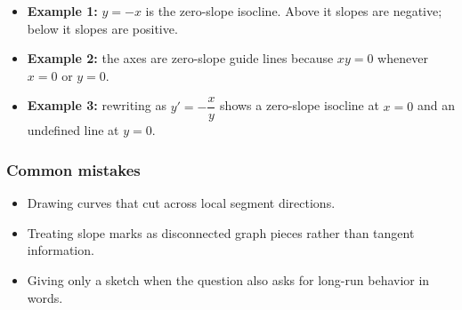 \begin{itemize}[leftmargin=*]
  \item \textbf{Example 1:} $y=-x$ is the zero-slope isocline. Above it slopes are negative; below it slopes are positive.
  \item \textbf{Example 2:} the axes are zero-slope guide lines because $xy=0$ whenever $x=0$ or $y=0$.
  \item \textbf{Example 3:} rewriting as $y'=-\dfrac{x}{y}$ shows a zero-slope isocline at $x=0$ and an undefined line at $y=0$.
\end{itemize}

\subsubsection*{Common mistakes}
\begin{itemize}[leftmargin=*]
  \item Drawing curves that cut across local segment directions.
  \item Treating slope marks as disconnected graph pieces rather than tangent information.
  \item Giving only a sketch when the question also asks for long-run behavior in words.
\end{itemize}
